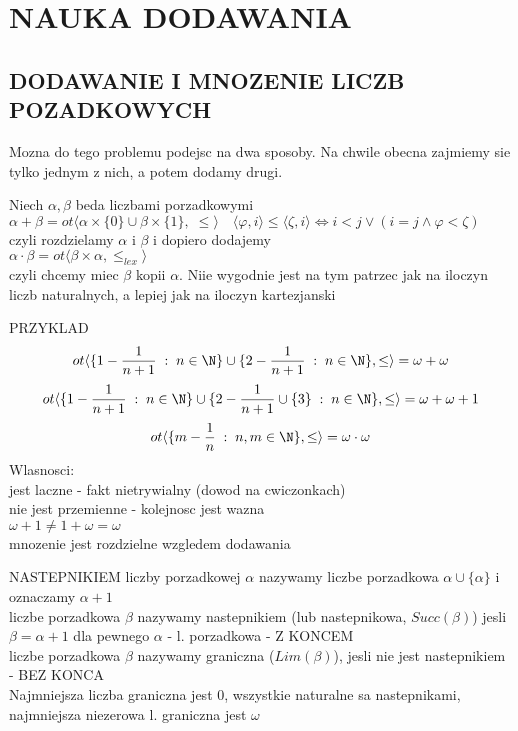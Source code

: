 \documentclass{article}
\begin{document}
\ttfamily
\section*{NAUKA DODAWANIA}
\subsection*{DODAWANIE I MNOZENIE LICZB POZADKOWYCH}
    Mozna do tego problemu podejsc na dwa sposoby. Na chwile obecna zajmiemy sie tylko jednym z nich, a potem dodamy drugi.\bigskip
    \begin{center}\large
        Niech $\alpha, \beta$ beda liczbami porzadkowymi\smallskip\\
        $\alpha+\beta = ot\langle\alpha\times\{0\}\cup\beta\times\{1\},\;\leq\rangle\quad \langle \varphi, i\rangle\leq\langle\zeta, i\rangle\iff i<j\lor (i=j\land\varphi<\zeta)$\smallskip\\
        czyli rozdzielamy $\alpha$ i $\beta$ i dopiero dodajemy\medskip\\
        $\alpha\cdot\beta=ot\langle\beta\times\alpha,\leq_{lex}\rangle$\smallskip\\
        czyli chcemy miec $\beta$ kopii $\alpha$. Niie wygodnie jest na tym patrzec jak na iloczyn liczb naturalnych, a lepiej jak na iloczyn kartezjanski
    \end{center}\bigskip
    {PRZYKLAD}
    $$ot\langle \{1-\frac1{n+1}\;:\;n\in\N\}\cup\{2-\frac1{n+1}\;:\;n\in\N\},\leq\rangle=\omega+\omega$$
    $$ot\langle \{1-\frac1{n+1}\;:\;n\in\N\}\cup\{2-\frac1{n+1}\cup\{3\}\;:\;n\in\N\},\leq\rangle=\omega+\omega+1$$
    $$ot\langle\{m-\frac1n\;:\;n,m\in\N\},\leq\rangle=\omega\cdot\omega$$
    Wlasnosci:\medskip\\
        \indent jest laczne - fakt nietrywialny ({\color{tit}dowod na cwiczonkach})\medskip\\
        \indent nie jest przemienne - kolejnosc jest wazna\smallskip\\
        \indent \indent $\omega+1\neq 1+\omega = \omega$\medskip\\
        \indent mnozenie jest rozdzielne wzgledem dodawania\bigskip
    \begin{center}\large
        {\color{def}NASTEPNIKIEM }liczby porzadkowej $\alpha$ nazywamy liczbe porzadkowa $\alpha\cup\{\alpha\}$ i oznaczamy $\alpha+1$\medskip\\
        liczbe porzadkowa $\beta$ nazywamy nastepnikiem (lub nastepnikowa, $Succ(\beta)$) jesli $\beta=\alpha+1$ dla pewnego $\alpha$ - l. porzadkowa - Z KONCEM\medskip\\
        liczbe porzadkowa $\beta$ nazywamy graniczna ($Lim(\beta)$), jesli nie jest nastepnikiem - BEZ KONCA\bigskip\\
        Najmniejsza liczba graniczna jest 0, wszystkie naturalne sa nastepnikami, najmniejsza niezerowa l. graniczna jest $\omega$
    \end{center}\bigskip
\end{document}
